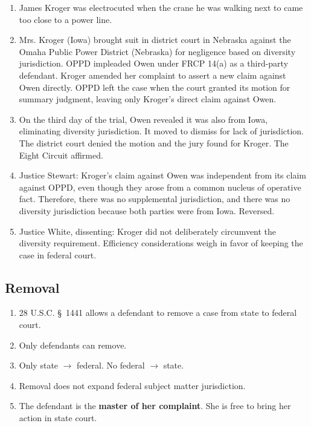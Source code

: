 \begin{enumerate}
    \item James Kroger was electrocuted when the crane he was walking next to 
    came too close to a power line.
    \item Mrs. Kroger (Iowa) brought suit in district court in Nebraska 
    against the Omaha Public Power District (Nebraska) for negligence based on 
    diversity jurisdiction. OPPD impleaded Owen under FRCP 14(a) as a 
    third-party defendant. Kroger amended her complaint to assert a new claim 
    against Owen directly. OPPD left the case when the court granted its 
    motion for summary judgment, leaving only Kroger's direct claim against 
    Owen.
    \item On the third day of the trial, Owen revealed it was also from Iowa, 
    eliminating diversity jurisdiction. It moved to dismiss for lack of 
    jurisdiction. The district court denied the motion and the jury found for 
    Kroger. The Eight Circuit affirmed.
    \item Justice Stewart: Kroger's claim against Owen was independent from 
    its claim against OPPD, even though they arose from a common nucleus of 
    operative fact. Therefore, there was no supplemental jurisdiction, and 
    there was no diversity jurisdiction because both parties were from Iowa.  
    Reversed.
    \item Justice White, dissenting: Kroger did not deliberately circumvent 
    the diversity requirement. Efficiency considerations weigh in favor of 
    keeping the case in federal court.
\end{enumerate}

\subsection{Removal}

\begin{enumerate}
    \item 28 U.S.C. \S\ 1441 allows a defendant to remove a case from state to 
    federal court.
    \item Only defendants can remove.
    \item Only state $\rightarrow$ federal. No federal $\rightarrow$ state.
    \item Removal does not expand federal subject matter jurisdiction.
    \item The defendant is the \textbf{master of her complaint}. She is free 
    to bring her action in state court.
\end{enumerate}

